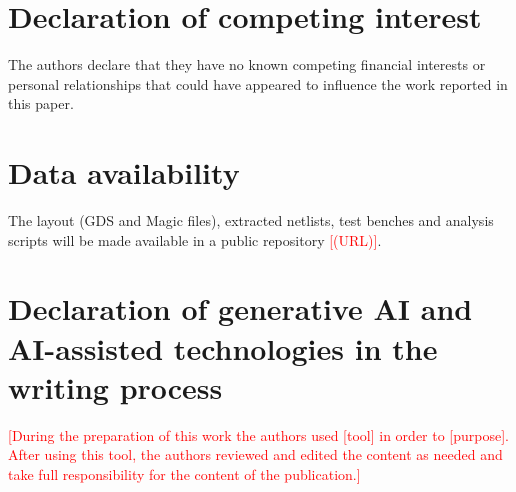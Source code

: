 \documentclass[a4paper,fleqn]{cas-dc}
\newcommand{\TBD}[1]{\textcolor{red}{[#1]}}
\begin{document}
\section*{Declaration of competing interest}
The authors declare that they have no known competing financial interests or personal relationships that could have appeared to influence the work reported in this paper.

\section*{Data availability}
The layout (GDS and Magic files), extracted netlists, test benches and analysis scripts will be made available in a public repository \TBD{(URL)}.

\section*{Declaration of generative AI and AI-assisted technologies in the writing process}
\TBD{During the preparation of this work the authors used [tool] in order to [purpose]. After using this tool, the authors reviewed and edited the content as needed and take full responsibility for the content of the publication.}


\printcredits



\end{document}
